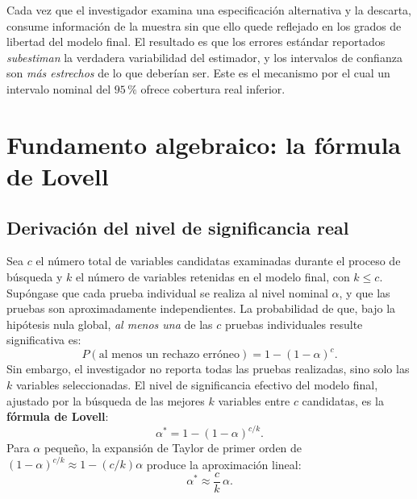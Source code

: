 \documentclass[12pt, letterpaper]{article}
\begin{document}
Cada vez que el investigador examina una especificación alternativa y la
descarta, consume información de la muestra sin que ello quede reflejado
en los grados de libertad del modelo final. El resultado es que los
errores estándar reportados \emph{subestiman} la verdadera variabilidad
del estimador, y los intervalos de confianza son \emph{más estrechos}
de lo que deberían ser. Este es el mecanismo por el cual un intervalo
nominal del $95\,\%$ ofrece cobertura real inferior.

\section{Fundamento algebraico: la fórmula de Lovell}

\subsection{Derivación del nivel de significancia real}

Sea $c$ el número total de variables candidatas examinadas durante el
proceso de búsqueda y $k$ el número de variables retenidas en el modelo
final, con $k \leq c$. Supóngase que cada prueba individual se realiza
al nivel nominal $\alpha$, y que las pruebas son aproximadamente
independientes. La probabilidad de que, bajo la hipótesis nula global,
\emph{al menos una} de las $c$ pruebas individuales resulte significativa
es:
\begin{equation}
  P(\text{al menos un rechazo erróneo}) = 1 - (1-\alpha)^c.
  \label{eq:bonferroni_c}
\end{equation}
Sin embargo, el investigador no reporta todas las pruebas realizadas,
sino solo las $k$ variables seleccionadas. El nivel de significancia
efectivo del modelo final, ajustado por la búsqueda de las mejores $k$
variables entre $c$ candidatas, es la \textbf{fórmula de Lovell}:
\begin{equation}
  \alpha^* = 1 - (1 - \alpha)^{c/k}.
  \label{eq:lovell_exacta}
\end{equation}
Para $\alpha$ pequeño, la expansión de Taylor de primer orden de
$(1-\alpha)^{c/k} \approx 1 - (c/k)\alpha$ produce la aproximación
lineal:
\begin{equation}
  \alpha^* \approx \frac{c}{k}\,\alpha.
  \label{eq:lovell_aprox}
\end{equation}
\end{document}
